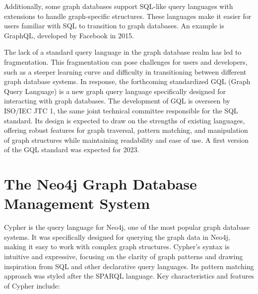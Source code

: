 Additionally, some graph databases support SQL-like query languages with extensions to handle graph-specific structures. These languages make it easier for users familiar with SQL to transition to graph databases. An example is GraphQL, developed by Facebook in 2015. 

The lack of a standard query language in the graph database realm has led to fragmentation. This fragmentation can pose challenges for users and developers, such as a steeper learning curve and difficulty in transitioning between different graph database systems. In response, the forthcoming standardized GQL (Graph Query Language) is a new graph query language specifically designed for interacting with graph databases. The development of GQL is overseen by ISO/IEC JTC 1, the same joint technical committee responsible for the SQL standard. Its design is expected to draw on the strengths of existing languages, offering robust features for graph traversal, pattern matching, and manipulation of graph structures while maintaining readability and ease of use. A first version of the GQL standard was expected for 2023.

\section{The Neo4j Graph Database Management System}

Cypher is the query language for Neo4j, one of the most popular graph database systems. It was specifically designed for querying the graph data in Neo4j, making it easy to work with complex graph structures. Cypher's syntax is intuitive and expressive, focusing on the clarity of graph patterns and drawing inspiration from SQL and other declarative query languages. Its pattern matching approach was styled after the SPARQL language. Key characteristics and features of Cypher include:

